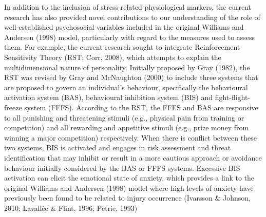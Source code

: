 \documentclass[man,floatsintext]{apa6}
\begin{document}
In addition to the inclusion of stress-related physiological markers, the current research has also provided novel contributions to our understanding of the role of well-established psychosocial variables included in the original Williams and Andersen (1998) model, particularly with regard to the measures used to assess them.
For example, the current research sought to integrate Reinforcement Sensitivity Theory (RST; Corr, 2008), which attempts to explain the multidimensional nature of personality.
Initially proposed by Gray (1982), the RST was revised by Gray and McNaughton (2000) to include three systems that are proposed to govern an individual's behaviour, specifically the behavioural activation system (BAS), behavioural inhibition system (BIS) and fight-flight-freeze system (FFFS).
According to the RST, the FFFS and BAS are responsive to all punishing and threatening stimuli (e.g., physical pain from training or competition) and all rewarding and appetitive stimuli (e.g., prize money from winning a major competition) respectively.
When there is conflict between these two systems, BIS is activated and engages in risk assessment and threat identification that may inhibit or result in a more cautious approach or avoidance behaviour initially considered by the BAS or FFFS systems.
Excessive BIS activation can elicit the emotional state of anxiety, which provides a link to the original Williams and Andersen (1998) model where high levels of anxiety have previously been found to be related to injury occurrence (Ivarsson \& Johnson, 2010; Lavallée \& Flint, 1996; Petrie, 1993)
\end{document}

